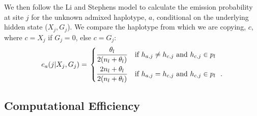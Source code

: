 We then follow the Li and Stephens model to calculate the emission probability at site $j$ for the unknown admixed haplotype, $a$, conditional on the underlying hidden state ($X_j,G_j$).
We compare the haplotype from which we are copying, $c$, where $c=X_j$ if $G_j=0$, else $c=G_j$:
\begin{equation}
    e_a(j|X_j,G_j) = \\
    \begin{dcases}
        \frac{ \theta_l }{ 2 (n_l+\theta_l ) }          & \text{if $h_{a,j} \ne h_{c,j}$ and $h_{c,j} \in p_l$ } \\
        \frac{ 2 n_l + \theta_l }{ 2(n_l+\theta_l) }    & \text{if $h_{a,j} = h_{c,j}$ and $h_{c,j} \in p_l$ } ~.
    \end{dcases}
\end{equation}



\subsection{Computational Efficiency}
